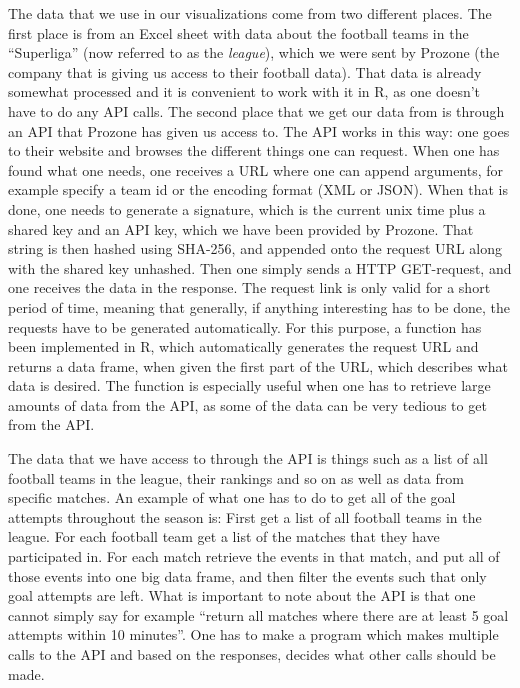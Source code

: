 \documentclass[Report.tex]{subfiles}
\begin{document}
The data that we use in our visualizations come from two different places. The first place is from an Excel sheet with data about the football teams in the ``Superliga'' (now referred to as the \emph{league}), which we were sent by Prozone (the company that is giving us access to their football data). That data is already somewhat processed and it is convenient to work with it in R, as one doesn't have to do any API calls. The second place that we get our data from is through an API that Prozone has given us access to. The API works in this way: one goes to their website and browses the different things one can request. When one has found what one needs, one receives a URL where one can append arguments, for example specify a team id or the encoding format (XML or JSON). When that is done, one needs to generate a signature, which is the current unix time plus a shared key and an API key, which we have been provided by Prozone. That string is then hashed using SHA-256, and appended onto the request URL along with the shared key unhashed. Then one simply sends a HTTP GET-request, and one receives the data in the response. The request link is only valid for a short period of time, meaning that generally, if anything interesting has to be done, the requests have to be generated automatically. For this purpose, a function has been implemented in R, which automatically generates the request URL and returns a data frame, when given the first part of the URL, which describes what data is desired. The function is especially useful when one has to retrieve large amounts of data from the API, as some of the data can be very tedious to get from the API. 

The data that we have access to through the API is things such as a list of all football teams in the league, their rankings and so on as well as data from specific matches. An example of what one has to do to get all of the goal attempts throughout the season is: First get a list of all football teams in the league. For each football team get a list of the matches that they have participated in. For each match retrieve the events in that match, and put all of those events into one big data frame, and then filter the events such that only goal attempts are left. What is important to note about the API is that one cannot simply say for example ``return all matches where there are at least 5 goal attempts within 10 minutes''. One has to make a program which makes multiple calls to the API and based on the responses, decides what other calls should be made.
\end{document}
